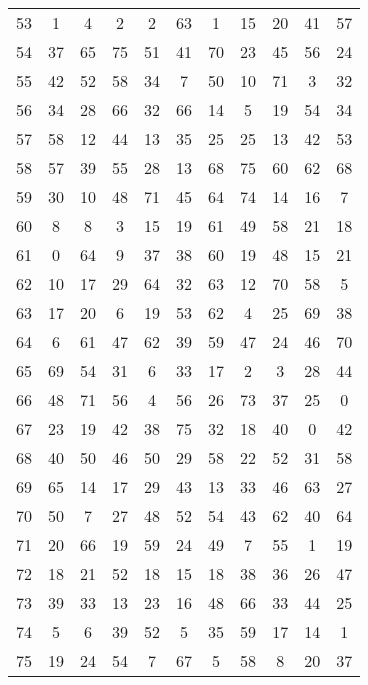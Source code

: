 \begin{table}
\begin{tabular}{c c c c c c c c c c c }
53 & 1 & 4 & 2 & 2 & 63 & 1 & 15 & 20 & 41 & 57 \\
54 & 37 & 65 & 75 & 51 & 41 & 70 & 23 & 45 & 56 & 24 \\
55 & 42 & 52 & 58 & 34 & 7 & 50 & 10 & 71 & 3 & 32 \\
56 & 34 & 28 & 66 & 32 & 66 & 14 & 5 & 19 & 54 & 34 \\
57 & 58 & 12 & 44 & 13 & 35 & 25 & 25 & 13 & 42 & 53 \\
58 & 57 & 39 & 55 & 28 & 13 & 68 & 75 & 60 & 62 & 68 \\
59 & 30 & 10 & 48 & 71 & 45 & 64 & 74 & 14 & 16 & 7 \\
60 & 8 & 8 & 3 & 15 & 19 & 61 & 49 & 58 & 21 & 18 \\
61 & 0 & 64 & 9 & 37 & 38 & 60 & 19 & 48 & 15 & 21 \\
62 & 10 & 17 & 29 & 64 & 32 & 63 & 12 & 70 & 58 & 5 \\
63 & 17 & 20 & 6 & 19 & 53 & 62 & 4 & 25 & 69 & 38 \\
64 & 6 & 61 & 47 & 62 & 39 & 59 & 47 & 24 & 46 & 70 \\
65 & 69 & 54 & 31 & 6 & 33 & 17 & 2 & 3 & 28 & 44 \\
66 & 48 & 71 & 56 & 4 & 56 & 26 & 73 & 37 & 25 & 0 \\
67 & 23 & 19 & 42 & 38 & 75 & 32 & 18 & 40 & 0 & 42 \\
68 & 40 & 50 & 46 & 50 & 29 & 58 & 22 & 52 & 31 & 58 \\
69 & 65 & 14 & 17 & 29 & 43 & 13 & 33 & 46 & 63 & 27 \\
70 & 50 & 7 & 27 & 48 & 52 & 54 & 43 & 62 & 40 & 64 \\
71 & 20 & 66 & 19 & 59 & 24 & 49 & 7 & 55 & 1 & 19 \\
72 & 18 & 21 & 52 & 18 & 15 & 18 & 38 & 36 & 26 & 47 \\
73 & 39 & 33 & 13 & 23 & 16 & 48 & 66 & 33 & 44 & 25 \\
74 & 5 & 6 & 39 & 52 & 5 & 35 & 59 & 17 & 14 & 1 \\
75 & 19 & 24 & 54 & 7 & 67 & 5 & 58 & 8 & 20 & 37 \\
\hline
\end{tabular}
\end{table}